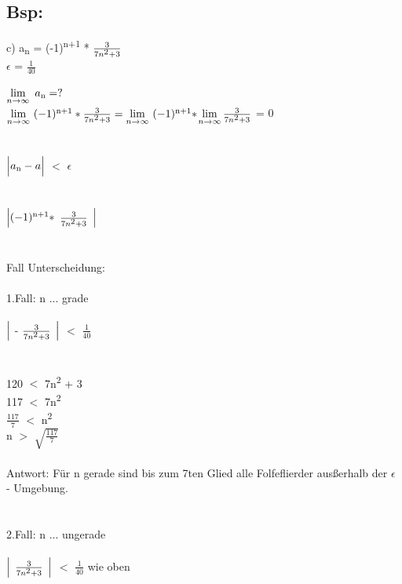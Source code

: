 \documentclass[../mainfile.tex]{subfile}
\author{Barbara Wiedermann}
\newcommand\tab[1][1cm]{\hspace*{#1}}
\begin{document}
	\subsection{Bsp:}
	c) a\textsubscript{n} = (-1)\textsuperscript{n+1} * $\frac{3}{7n\textsuperscript{2} + 3}$\\
	 \tab $\epsilon$ = $\frac{1}{40}$\\\\
	
	\(\lim\limits_{n \to \infty}\ a\textsubscript{n}=?\)\\
	
	\(\lim\limits_{n \to \infty}\ (-1)\textsuperscript{n+1} * \frac{3}{7n\textsuperscript{2} + 3}= \lim\limits_{n \to \infty}\ (-1)\textsuperscript{n+1} * \)\(\lim\limits_{n \to \infty}\frac{3}{7n\textsuperscript{2} + 3}\) = 0\\\\\\
	$\Bigl| a\textsubscript{n} - a\Bigl| $ $<$ $\epsilon$\\\\\\
	$\Bigl| (-1)\textsuperscript{n+1} *$ $\frac{3}{7n\textsuperscript{2} + 3}$ $\Bigl| $ \\\\\\
	Fall Unterscheidung:\\\\
	1.Fall: n ... grade\\\\
	$\Bigl|$ - $\frac{3}{7n\textsuperscript{2} + 3}$ $\Bigl| $ $<$ $\frac{1}{40}$\\\\\\
	120 $<$ 7n\textsuperscript{2} + 3\\
	117 $<$ 7n\textsuperscript{2}\\
	$\frac{117}{7}$ $<$ n\textsuperscript{2}\\
	n $>$ $\sqrt{\frac{117}{7}}$\\\\
	
	Antwort: Für n gerade sind bis zum 7ten Glied alle Folfeflierder ausßerhalb der $\epsilon$ - Umgebung.\\\\\\
	
	2.Fall: n ... ungerade\\\\
	$\Bigl|$ $\frac{3}{7n\textsuperscript{2} + 3}$ $\Bigl|$ $<$ $\frac{1}{40}$ wie oben
	
	
	
	
	
	
\end{document}
